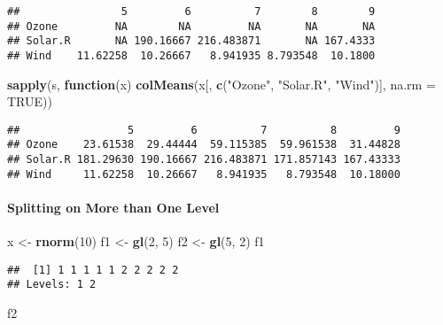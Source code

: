 \documentclass[
]{article}
\newenvironment{Shaded}{\begin{snugshade}}{\end{snugshade}}
\newcommand{\ControlFlowTok}[1]{\textcolor[rgb]{0.13,0.29,0.53}{\textbf{#1}}}
\newcommand{\DataTypeTok}[1]{\textcolor[rgb]{0.13,0.29,0.53}{#1}}
\newcommand{\DecValTok}[1]{\textcolor[rgb]{0.00,0.00,0.81}{#1}}
\newcommand{\KeywordTok}[1]{\textcolor[rgb]{0.13,0.29,0.53}{\textbf{#1}}}
\newcommand{\NormalTok}[1]{#1}
\newcommand{\OtherTok}[1]{\textcolor[rgb]{0.56,0.35,0.01}{#1}}
\newcommand{\StringTok}[1]{\textcolor[rgb]{0.31,0.60,0.02}{#1}}
\begin{document}
\begin{verbatim}
##                5         6          7        8        9
## Ozone         NA        NA         NA       NA       NA
## Solar.R       NA 190.16667 216.483871       NA 167.4333
## Wind    11.62258  10.26667   8.941935 8.793548  10.1800
\end{verbatim}

\begin{Shaded}
\begin{Highlighting}[]
\KeywordTok{sapply}\NormalTok{(s, }\ControlFlowTok{function}\NormalTok{(x) }\KeywordTok{colMeans}\NormalTok{(x[, }\KeywordTok{c}\NormalTok{(}\StringTok{"Ozone"}\NormalTok{, }\StringTok{"Solar.R"}\NormalTok{, }\StringTok{"Wind"}\NormalTok{)], }\DataTypeTok{na.rm =} \OtherTok{TRUE}\NormalTok{))}
\end{Highlighting}
\end{Shaded}

\begin{verbatim}
##                 5         6          7          8         9
## Ozone    23.61538  29.44444  59.115385  59.961538  31.44828
## Solar.R 181.29630 190.16667 216.483871 171.857143 167.43333
## Wind     11.62258  10.26667   8.941935   8.793548  10.18000
\end{verbatim}

\hypertarget{splitting-on-more-than-one-level}{%
\paragraph{Splitting on More than One
Level}\label{splitting-on-more-than-one-level}}

\begin{Shaded}
\begin{Highlighting}[]
\NormalTok{x \textless{}{-}}\StringTok{ }\KeywordTok{rnorm}\NormalTok{(}\DecValTok{10}\NormalTok{)}
\NormalTok{f1 \textless{}{-}}\StringTok{ }\KeywordTok{gl}\NormalTok{(}\DecValTok{2}\NormalTok{, }\DecValTok{5}\NormalTok{)}
\NormalTok{f2 \textless{}{-}}\StringTok{ }\KeywordTok{gl}\NormalTok{(}\DecValTok{5}\NormalTok{, }\DecValTok{2}\NormalTok{)}
\NormalTok{f1}
\end{Highlighting}
\end{Shaded}

\begin{verbatim}
##  [1] 1 1 1 1 1 2 2 2 2 2
## Levels: 1 2
\end{verbatim}

\begin{Shaded}
\begin{Highlighting}[]
\NormalTok{f2}
\end{Highlighting}
\end{Shaded}
\end{document}
